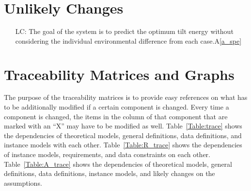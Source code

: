 \documentclass[12pt]{article}
\newcommand{\aref}[1]{A\ref{#1}}
\newcounter{lcnum} %
\begin{document}
\section{Unlikely Changes}    

\noindent \begin{itemize}

\item[LC\refstepcounter{lcnum}\thelcnum\label{LC_G}:] The goal of the system is to predict the optimum tilt energy without considering the individual environmental difference from each case.\aref{a_spe}

\end{itemize}

\section{Traceability Matrices and Graphs}

The purpose of the traceability matrices is to provide easy references on what
has to be additionally modified if a certain component is changed.  Every time a
component is changed, the items in the column of that component that are marked
with an ``X'' may have to be modified as well.  Table~\ref{Table:trace} shows the
dependencies of theoretical models, general definitions, data definitions, and
instance models with each other. Table~\ref{Table:R_trace} shows the
dependencies of instance models, requirements, and data constraints on each
other. Table~\ref{Table:A_trace} shows the dependencies of theoretical models,
general definitions, data definitions, instance models, and likely changes on
the assumptions.\\

\end{document}
